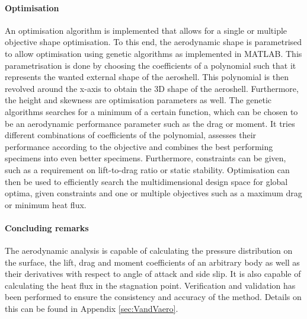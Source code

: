 \paragraph{Optimisation} \label{par:Optimisation}
An optimisation algorithm is implemented that allows for a single or multiple objective shape optimisation. To this end, the aerodynamic shape is parametrised to allow optimisation using genetic algorithms as implemented in MATLAB. This parametrisation is done by choosing the coefficients of a polynomial such that it represents the wanted external shape of the aeroshell. This polynomial is then revolved around the x-axis to obtain the 3D shape of the aeroshell. Furthermore, the height and skewness are optimisation parameters as well. The genetic algorithms searches for a minimum of a certain function, which can be chosen to be an aerodynamic performance parameter such as the drag or moment. It tries different combinations of coefficients of the polynomial, assesses their performance according to the objective and combines the best performing specimens into even better specimens. Furthermore, constraints can be given, such as a requirement on lift-to-drag ratio or static stability. Optimisation can then be used to efficiently search the multidimensional design space for global optima, given constraints and one or multiple objectives such as a maximum drag or minimum heat flux.

\paragraph{Concluding remarks}
The aerodynamic analysis is capable of calculating the pressure distribution on the surface, the lift, drag and moment coefficients of an arbitrary body as well as their derivatives with respect to angle of attack and side slip. It is also capable of calculating the heat flux in the stagnation point. Verification and validation has been performed to ensure the consistency and accuracy of the method. Details on this can be found in Appendix \ref{sec:VandVaero}.







